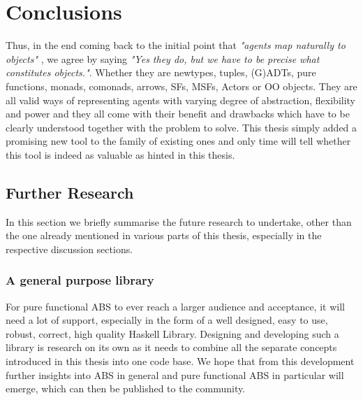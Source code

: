 \chapter{Conclusions}
\label{ch:conclusions}
Thus, in the end coming back to the initial point that \textit{"agents map naturally to objects"} \cite{north_managing_2007}, we agree by saying \textit{"Yes they do, but we have to be precise what constitutes objects."}. Whether they are newtypes, tuples, (G)ADTs, pure functions, monads, comonads, arrows, SFs, MSFs, Actors or OO objects. They are all valid ways of representing agents with varying degree of abstraction, flexibility and power and they all come with their benefit and drawbacks which have to be clearly understood together with the problem to solve. This thesis simply added a promising new tool to the family of existing ones and only time will tell whether this tool is indeed as valuable as hinted in this thesis.

\section{Further Research}
In this section we briefly summarise the future research to undertake, other than the one already mentioned in various parts of this thesis, especially in the respective discussion sections.

\subsection{A general purpose library}
For pure functional ABS to ever reach a larger audience and acceptance, it will need a lot of support, especially in the form of a well designed, easy to use, robust, correct, high quality Haskell Library. Designing and developing such a library is research on its own as it needs to combine all the separate concepts introduced in this thesis into one code base. We hope that from this development further insights into ABS in general and pure functional ABS in particular will emerge, which can then be published to the community.



